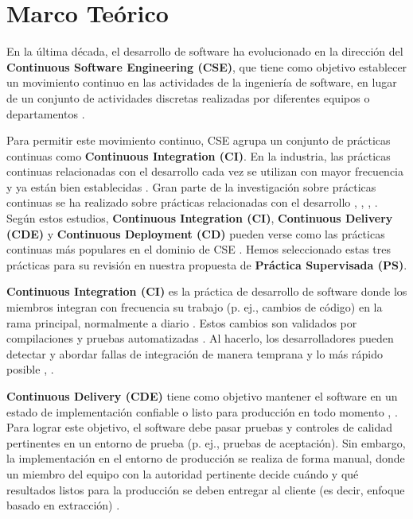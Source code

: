 \chapter{Marco Teórico}\label{cap:marco_teorico}
En la última década, el desarrollo de software ha evolucionado en la dirección del \textbf{Continuous Software Engineering (CSE)}, que tiene como objetivo establecer un movimiento continuo en las actividades de la ingeniería de software, en lugar de un conjunto de actividades discretas realizadas por diferentes equipos o departamentos \cite{FITZGERALD2017176}.

Para permitir este movimiento continuo, CSE agrupa un conjunto de prácticas continuas como \textbf{Continuous Integration (CI)}. En la industria, las prácticas continuas relacionadas con el desarrollo cada vez se utilizan con mayor frecuencia y ya están bien establecidas \cite{Bosch2014}. Gran parte de la investigación sobre prácticas continuas se ha realizado sobre prácticas relacionadas con el desarrollo  \cite{Shahin2017ContinuousID}, \cite{10.1007/s10664-018-9651-4}, \cite{Schermann}, \cite{10.1145/3383219.3383224}. Según estos estudios, \textbf{Continuous Integration (CI)}, \textbf{Continuous Delivery (CDE)} y \textbf{Continuous Deployment (CD)} pueden verse como las prácticas continuas más populares en el dominio de CSE \cite{Sthl2017ContinuousPA}. Hemos seleccionado estas tres prácticas para su revisión en nuestra propuesta de \textbf{Práctica Supervisada (PS)}.

\textbf{Continuous Integration (CI)} es la práctica de desarrollo de software donde los miembros integran con frecuencia su trabajo (p. ej., cambios de código) en la rama principal, normalmente a diario \cite{Sthl2017ContinuousPA}.  Estos cambios son validados por compilaciones y pruebas automatizadas \cite{7057604}. Al hacerlo, los desarrolladores pueden detectar y abordar fallas de integración de manera temprana y lo más rápido posible \cite{7057604}, \cite{FITZGERALD2017176}.

\textbf{Continuous Delivery (CDE)} tiene como objetivo mantener el software en un estado de implementación confiable o listo para producción en todo momento \cite{10.1007/s10664-018-9651-4}, \cite{7006384}. Para lograr este objetivo, el software debe pasar pruebas y controles de calidad pertinentes en un entorno de prueba (p. ej., pruebas de aceptación). Sin embargo, la implementación en el entorno de producción se realiza de forma manual, donde un miembro del equipo con la autoridad pertinente decide cuándo y qué resultados listos para la producción se deben entregar al cliente (es decir, enfoque basado en extracción) \cite{10.1007/s10664-018-9651-4}.


